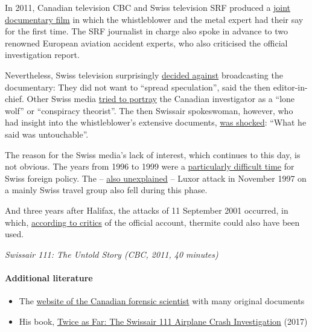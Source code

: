 In 2011, Canadian television CBC and Swiss television SRF produced a
\href{https://www.youtube.com/watch?v=s9rVKWsMv_g}{joint documentary
film} in which the whistleblower and the metal expert had their say for
the first time. The SRF journalist in charge also spoke in advance to
two renowned European aviation accident experts, who also criticised the
official investigation report.

Nevertheless, Swiss television surprisingly
\href{http://www.news.ch/SRF+strahlt+Halifax+Doku+nicht+aus/508488/detail.htm}{decided
against} broadcasting the documentary: They did not want to ``spread
speculation'', said the then editor-in-chief. Other Swiss media
\href{https://www.nzz.ch/ein_einzelkaempfer_will_keine_ruhe_geben-1.12534482}{tried
to portray} the Canadian investigator as a ``lone wolf'' or ``conspiracy
theorist''. The then Swissair spokeswoman, however, who had insight into
the whistleblower's extensive documents,
\href{http://www.news.ch/SRF+strahlt+Halifax+Doku+nicht+aus/508488/detail.htm}{was
shocked}: ``What he said was untouchable''.

The reason for the Swiss media's lack of interest, which continues to
this day, is not obvious. The years from 1996 to 1999 were a
\href{https://interaktiv.bernerzeitung.ch/2018/schweizer-privatagenten/}{particularly
difficult time} for Swiss foreign policy. The --
\href{https://en.wikipedia.org/wiki/Luxor_massacre}{also unexplained} --
Luxor attack in November 1997 on a mainly Swiss travel group also fell
during this phase.

And three years after Halifax, the attacks of 11 September 2001
occurred, in which,
\href{https://en.wikipedia.org/wiki/World_Trade_Center_controlled_demolition_conspiracy_theories}{according
to critics} of the official account, thermite could also have been used.

\emph{Swissair 111: The Untold Story (CBC, 2011, 40 minutes)}

\hypertarget{additional-literature}{%
\paragraph{Additional literature}\label{additional-literature}}

\begin{itemize}
\tightlist
\item
  The \href{http://www.swissair111.ca/}{website of the Canadian forensic
  scientist} with many original documents
\item
  His book,
  \href{https://www.amazon.com/Twice-Far-SwissAir-Airplane-Investigation/dp/1540879593/}{Twice
  as Far: The Swissair 111 Airplane Crash Investigation} (2017)
\end{itemize}

